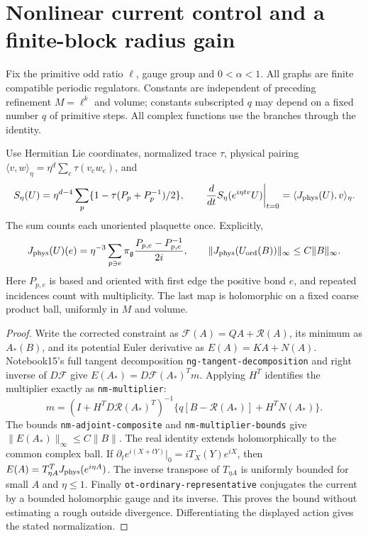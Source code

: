 \section{Nonlinear current control and a finite-block radius gain}
\label{mrg-section}
Fix the primitive odd ratio $\ell$, gauge group and $0<\alpha<1$.
All graphs are finite compatible periodic regulators. Constants are
independent of preceding refinement $M=\ell^k$ and volume; constants
subscripted $q$ may depend on a fixed number $q$ of primitive steps.
All complex functions use the branches through the identity.

\begin{proposition}
\label{mrg-current}
Use Hermitian Lie coordinates, normalized trace $\tau$, physical pairing
$\langle v,w\rangle_\eta=\eta^d\sum_e\tau(v_ew_e)$, and
\[
 S_\eta(U)=\eta^{d-4}\sum_p\{1-\tau(P_p+P_p^{-1})/2\},\qquad
 \left.\frac d{dt}S_\eta(e^{i\eta tv}U)\right|_{t=0}
       =\langle J_{\rm phys}(U),v\rangle_\eta .
\]
The sum counts each unoriented plaquette once. Explicitly,
\begin{equation}
 J_{\rm phys}(U)(e)=\eta^{-3}\sum_{p\ni e}
       \pi_{\mathfrak g}\frac{P_{p,e}-P_{p,e}^{-1}}{2i},
 \qquad
 \|J_{\rm phys}(U_{\rm ord}(B))\|_\infty\le C\|B\|_\infty.
 \label{mrg-current-bound}
\end{equation}
Here $P_{p,e}$ is based and oriented with first edge the positive bond
$e$, and repeated incidences count with multiplicity. The last map is
holomorphic on a fixed coarse product ball, uniformly in $M$ and volume.
\end{proposition}
\begin{proof}
Write the corrected constraint as $\mathcal F(A)=QA+\mathcal R(A)$,
its minimum as $A_*(B)$, and its potential Euler derivative as
$E(A)=KA+N(A)$. Notebook15's full tangent decomposition
\texttt{ng-tangent-decomposition} and right inverse of $D\mathcal F$
give $E(A_*)=D\mathcal F(A_*)^Tm$. Applying $H^T$ identifies
the multiplier exactly as \texttt{nm-multiplier}:
\[
 m=(I+H^TD\mathcal R(A_*)^T)^{-1}
       \{q[B-\mathcal R(A_*)]+H^TN(A_*)\}.
\]
The bounds \texttt{nm-adjoint-composite} and
\texttt{nm-multiplier-bounds} give $\|E(A_*)\|_\infty\le C\|B\|$.
The real identity extends holomorphically to the common complex ball.
If $\partial_t e^{i(X+tY)}|_0=iT_X(Y)e^{iX}$, then
$E(A)=T_{\eta A}^TJ_{\rm phys}(e^{i\eta A})$.
The inverse transpose of $T_{\eta A}$ is uniformly bounded for small
$A$ and $\eta\le1$. Finally \texttt{ot-ordinary-representative}
conjugates the current by a bounded holomorphic gauge and its inverse.
This proves the bound without estimating a rough outside divergence.
Differentiating the displayed action gives the stated normalization.
\end{proof}

